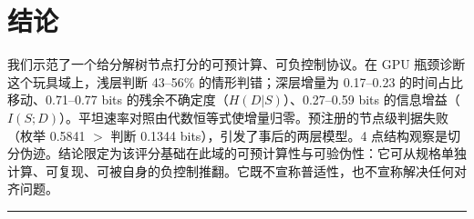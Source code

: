 \documentclass[10pt]{article}
\begin{document}
\section{结论}\label{conclusion}

我们示范了一个给分解树节点打分的可预计算、可负控制协议。在 GPU 瓶颈诊断这个玩具域上，浅层判断 43--56\% 的情形判错；深层增量为 0.17--0.23 的时间占比移动、0.71--0.77 bits 的残余不确定度（$H(D|S)$）、0.27--0.59 bits 的信息增益（$I(S;D)$）。平坦速率对照由代数恒等式使增量归零。预注册的节点级判据失败（枚举 0.5841 $>$ 判断 0.1344 bits），引发了事后的两层模型。4 点结构观察是切分伪迹。结论限定为该评分基础在此域的可预计算性与可验伪性：它可从规格单独计算、可复现、可被自身的负控制推翻。它既不宣称普适性，也不宣称解决任何对齐问题。

\begin{center}\rule{0.5\linewidth}{0.5pt}\end{center}




\end{document}
